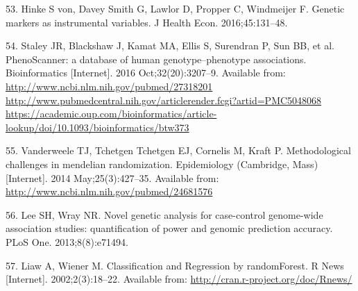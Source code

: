 \documentclass[]{article}
\begin{document}
\hypertarget{ref-VonHinke2016}{}
53. Hinke S von, Davey Smith G, Lawlor D, Propper C, Windmeijer F.
Genetic markers as instrumental variables. J Health Econ.
2016;45:131--48.

\hypertarget{ref-Staley2016}{}
54. Staley JR, Blackshaw J, Kamat MA, Ellis S, Surendran P, Sun BB, et
al. PhenoScanner: a database of human genotype--phenotype associations.
Bioinformatics {[}Internet{]}. 2016 Oct;32(20):3207--9. Available from:
\href{http://www.ncbi.nlm.nih.gov/pubmed/27318201\%20http://www.pubmedcentral.nih.gov/articlerender.fcgi?artid=PMC5048068\%20https://academic.oup.com/bioinformatics/article-lookup/doi/10.1093/bioinformatics/btw373}{http://www.ncbi.nlm.nih.gov/pubmed/27318201 http://www.pubmedcentral.nih.gov/articlerender.fcgi?artid=PMC5048068 https://academic.oup.com/bioinformatics/article-lookup/doi/10.1093/bioinformatics/btw373}

\hypertarget{ref-Vanderweele2014}{}
55. Vanderweele TJ, Tchetgen Tchetgen EJ, Cornelis M, Kraft P.
Methodological challenges in mendelian randomization. Epidemiology
(Cambridge, Mass) {[}Internet{]}. 2014 May;25(3):427--35. Available
from: \url{http://www.ncbi.nlm.nih.gov/pubmed/24681576}

\hypertarget{ref-Lee2013c}{}
56. Lee SH, Wray NR. Novel genetic analysis for case-control genome-wide
association studies: quantification of power and genomic prediction
accuracy. PLoS One. 2013;8(8):e71494.

\hypertarget{ref-Liaw2002}{}
57. Liaw A, Wiener M. Classification and Regression by randomForest. R
News {[}Internet{]}. 2002;2(3):18--22. Available from:
\url{http://cran.r-project.org/doc/Rnews/}
\end{document}
